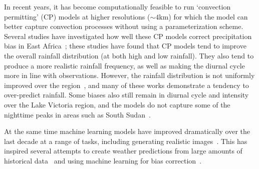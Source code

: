 \documentclass{article}
\begin{document}
In recent years, it has become computationally feasible to run `convection permitting' (CP) models at higher resolutions ($\sim4\text{km}$) for which the model can better capture convection processes without using a parameterization scheme. Several studies have investigated how well these CP models correct precipitation bias in East Africa~\citep{finney_implications_2019, cafaro_convection-permitting_2021, woodhams_what_2018, chamberlain_forecasting_2014, kendon_enhanced_2019, senior_convection-permitting_2021}; these studies have found that CP models tend to improve the overall rainfall distribution (at both high and low rainfall). They also tend to produce a more realistic rainfall frequency, as well as making the diurnal cycle more in line with observations. However, the rainfall distribution is not uniformly improved over the region~\citep{senior_convection-permitting_2021}, and many of these works demonstrate a tendency to over-predict rainfall. Some biases also still remain in diurnal cycle and intensity over the Lake Victoria region, and the models do not capture some of the nighttime peaks in areas such as South Sudan~\citep{finney_implications_2019, chamberlain_forecasting_2014}. 




At the same time machine learning models have improved dramatically over the last decade at a range of tasks, including generating realistic images~\citep{karras_style-based_2019}. This has inspired several attempts to create weather predictions from large amounts of historical data~\citep{nguyen_climax_2023, bi_pangu-weather_2022,ravuri_skilful_2021, zhang_skilful_2023,lam_graphcast_2022} and using machine learning for bias correction~\citep{rasp_neural_2018,ben-bouallegue_improving_2023}.
\end{document}
